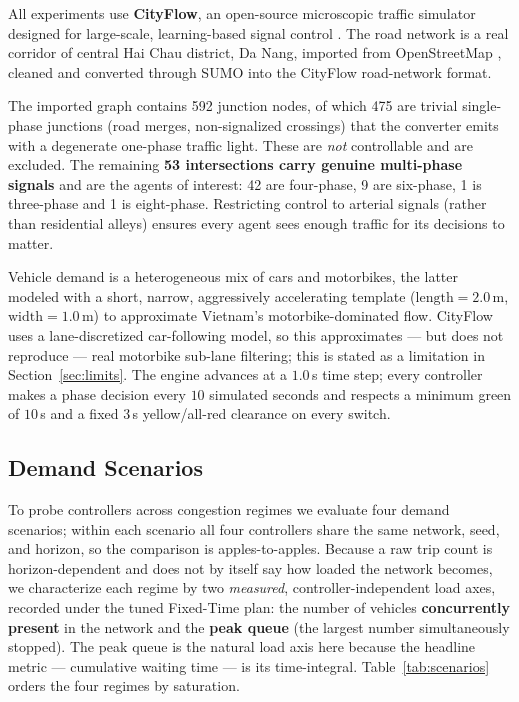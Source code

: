 All experiments use \textbf{CityFlow}, an open-source microscopic traffic simulator
designed for large-scale, learning-based signal control \cite{CityFlow_2019}. The road
network is a real corridor of central Hai Chau district, Da Nang, imported from
OpenStreetMap \cite{Haklay_2010,OSM_SUMO_2022}, cleaned and converted through SUMO
\cite{SUMO_2018,Lopez_2018} into the CityFlow road-network format.

The imported graph contains 592 junction nodes, of which 475 are trivial single-phase
junctions (road merges, non-signalized crossings) that the converter emits with a
degenerate one-phase traffic light. These are \emph{not} controllable and are excluded.
The remaining \textbf{53 intersections carry genuine multi-phase signals} and are the
agents of interest: 42 are four-phase, 9 are six-phase, 1 is three-phase and 1 is
eight-phase. Restricting control to arterial signals (rather than residential alleys)
ensures every agent sees enough traffic for its decisions to matter.

Vehicle demand is a heterogeneous mix of cars and motorbikes, the latter modeled with a
short, narrow, aggressively accelerating template ($\text{length}=2.0$\,m,
$\text{width}=1.0$\,m) to approximate Vietnam's motorbike-dominated flow. CityFlow uses a
lane-discretized car-following model, so this approximates --- but does not reproduce ---
real motorbike sub-lane filtering; this is stated as a limitation in
Section~\ref{sec:limits}. The engine advances at a $1.0$\,s time step; every controller
makes a phase decision every $10$ simulated seconds and respects a minimum green of
$10$\,s and a fixed $3$\,s yellow/all-red clearance on every switch.

\subsection{Demand Scenarios}
\label{sec:scenarios}

To probe controllers across congestion regimes we evaluate four demand scenarios; within
each scenario all four controllers share the same network, seed, and horizon, so the
comparison is apples-to-apples. Because a raw trip count is horizon-dependent and does not
by itself say how loaded the network becomes, we characterize each regime by two
\emph{measured}, controller-independent load axes, recorded under the tuned Fixed-Time
plan: the number of vehicles \textbf{concurrently present} in the network and the
\textbf{peak queue} (the largest number simultaneously stopped). The peak queue is the
natural load axis here because the headline metric --- cumulative waiting time --- is its
time-integral. Table~\ref{tab:scenarios} orders the four regimes by saturation.

